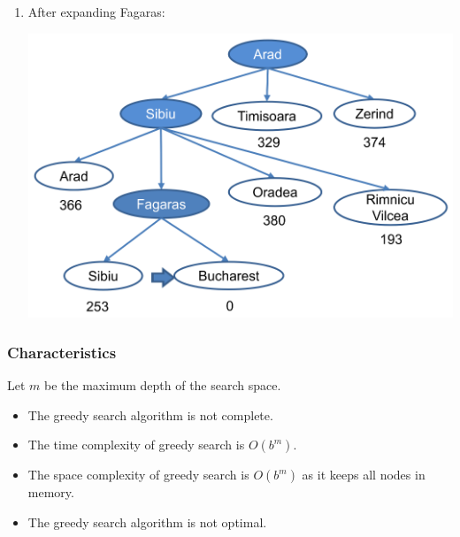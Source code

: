 \documentclass[11pt]{article}
\begin{document}
\begin{enumerate}
\begin{center}
\end{center}
\item After expanding Fagaras:
\begin{center}
\includegraphics[width=.9\linewidth]{./images/greedy-search-example-after-expanding-fagaras-diagram.png}
\end{center}
\end{enumerate}
\subsubsection{Characteristics}
\label{sec:orgb11d292}
Let \(m\) be the maximum depth of the search space.
\begin{itemize}
\item The greedy search algorithm is not complete.
\item The time complexity of greedy search is \(O(b^m)\).
\item The space complexity of greedy search is \(O(b^m)\) as it keeps all nodes in memory.
\item The greedy search algorithm is not optimal.
\end{itemize}

 \newpage
\end{document}
